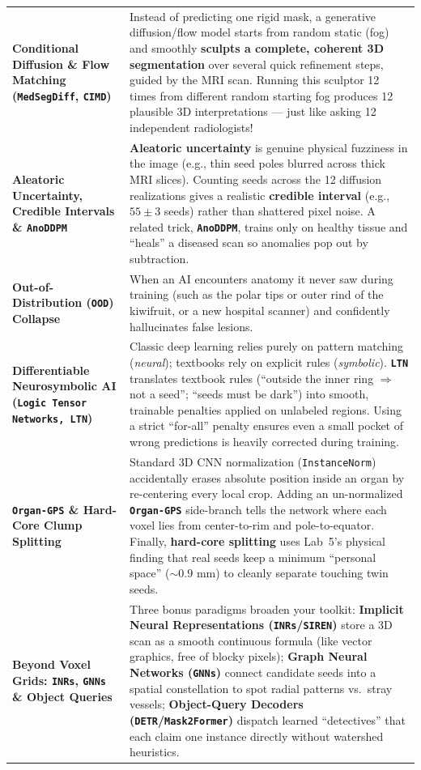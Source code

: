 \documentclass[10.5pt,a4paper]{article}
\begin{document}
\begin{table}[H]
\begin{tabularx}{\textwidth}{L{3.55cm} Y}
\textbf{Conditional Diffusion \& Flow Matching (\texttt{MedSegDiff}, \texttt{CIMD})} & Instead of predicting one rigid mask, a generative diffusion/flow model starts from random static (fog) and smoothly \textbf{sculpts a complete, coherent 3D segmentation} over several quick refinement steps, guided by the MRI scan. Running this sculptor 12 times from different random starting fog produces 12 plausible 3D interpretations --- just like asking 12 independent radiologists! \\
\textbf{Aleatoric Uncertainty, Credible Intervals \& \texttt{AnoDDPM}} & \textbf{Aleatoric uncertainty} is genuine physical fuzziness in the image (e.g., thin seed poles blurred across thick MRI slices). Counting seeds across the 12 diffusion realizations gives a realistic \textbf{credible interval} (e.g., $55 \pm 3$ seeds) rather than shattered pixel noise. A related trick, \textbf{\texttt{AnoDDPM}}, trains only on healthy tissue and ``heals'' a diseased scan so anomalies pop out by subtraction. \\
\textbf{Out-of-Distribution (\texttt{OOD}) Collapse} & When an AI encounters anatomy it never saw during training (such as the polar tips or outer rind of the kiwifruit, or a new hospital scanner) and confidently hallucinates false lesions. \\
\textbf{Differentiable Neurosymbolic AI (\texttt{Logic Tensor Networks, LTN})} & Classic deep learning relies purely on pattern matching (\emph{neural}); textbooks rely on explicit rules (\emph{symbolic}). \textbf{\texttt{LTN}} translates textbook rules (``outside the inner ring $\Rightarrow$ not a seed''; ``seeds must be dark'') into smooth, trainable penalties applied on unlabeled regions. Using a strict ``for-all'' penalty ensures even a small pocket of wrong predictions is heavily corrected during training. \\
\textbf{\texttt{Organ-GPS} \& Hard-Core Clump Splitting} & Standard 3D CNN normalization (\texttt{InstanceNorm}) accidentally erases absolute position inside an organ by re-centering every local crop. Adding an un-normalized \textbf{\texttt{Organ-GPS}} side-branch tells the network where each voxel lies from center-to-rim and pole-to-equator. Finally, \textbf{hard-core splitting} uses Lab~5's physical finding that real seeds keep a minimum ``personal space'' ($\sim 0.9\text{ mm}$) to cleanly separate touching twin seeds. \\
\textbf{Beyond Voxel Grids: \texttt{INRs}, \texttt{GNNs} \& Object Queries} & Three bonus paradigms broaden your toolkit: \textbf{Implicit Neural Representations (\texttt{INRs}/\texttt{SIREN})} store a 3D scan as a smooth continuous formula (like vector graphics, free of blocky pixels); \textbf{Graph Neural Networks (\texttt{GNNs})} connect candidate seeds into a spatial constellation to spot radial patterns vs.\ stray vessels; \textbf{Object-Query Decoders (\texttt{DETR}/\texttt{Mask2Former})} dispatch learned ``detectives'' that each claim one instance directly without watershed heuristics. \\

\end{tabularx}
\end{table}
\end{document}
